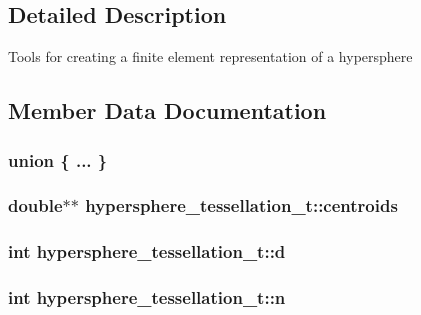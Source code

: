 \subsection{Detailed Description}
Tools for creating a finite element representation of a hypersphere 

\subsection{Member Data Documentation}
\hypertarget{structhypersphere__tessellation__t_a1597a5b73d7b389fb1d646fee34ee509}{
\subsubsection[{"@1}]{\setlength{\rightskip}{0pt plus 5cm}union \{ ... \} }}
\label{structhypersphere__tessellation__t_a1597a5b73d7b389fb1d646fee34ee509}
\hypertarget{structhypersphere__tessellation__t_a6cedeba23c0a5c74622e38195418f73d}{
\subsubsection[{centroids}]{\setlength{\rightskip}{0pt plus 5cm}double$\ast$$\ast$ {\bf hypersphere\_\-tessellation\_\-t::centroids}}}
\label{structhypersphere__tessellation__t_a6cedeba23c0a5c74622e38195418f73d}
\hypertarget{structhypersphere__tessellation__t_a32d3e8a25880ee139ced3ec658c41b89}{
\subsubsection[{d}]{\setlength{\rightskip}{0pt plus 5cm}int {\bf hypersphere\_\-tessellation\_\-t::d}}}
\label{structhypersphere__tessellation__t_a32d3e8a25880ee139ced3ec658c41b89}
\hypertarget{structhypersphere__tessellation__t_aba8398c682a35ef1a8834f2023f86569}{
\subsubsection[{n}]{\setlength{\rightskip}{0pt plus 5cm}int {\bf hypersphere\_\-tessellation\_\-t::n}}}
